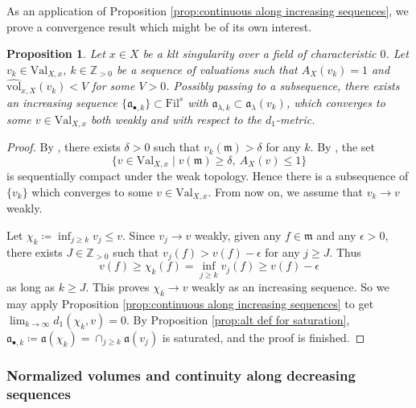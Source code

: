 \documentclass[11pt, leqno]{amsart}%
\theoremstyle{plain}
\newtheorem{proposition}[theorem]{Proposition}
\theoremstyle{definition}
\theoremstyle{remark}
\newcommand{\bZ}{\mathbb{Z}}
\newcommand{\fa}{\mathfrak{a}}
\newcommand{\fm}{\mathfrak{m}}
\newcommand{\Val}{\mathrm{Val}}
\newcommand{\nvol}{\widehat{\mathrm{vol}}}
\newcommand{\Fil}{\mathrm{Fil}}
\numberwithin{equation}{section}
\begin{document}
As an application of Proposition \ref{prop:continuous along increasing sequences}, we prove a convergence result which might be of its own interest. 

\begin{proposition}\label{prop:modified d_1-converging seq}
    Let $x\in X$ be a klt singularity over a field of characteristic $0$. Let $v_k\in\Val_{X,x}$, $k\in\bZ_{>0}$ be a sequence of valuations such that $A_X(v_k)=1$ and $\nvol_{x,X}(v_k)<V$ for some $V>0$. Possibly passing to a subsequence, there exists an increasing sequence $\{\fa_{\bullet,k}\}\subset\Fil^s$ with $\fa_{\lambda,k}\subset\fa_\lambda(v_k)$, which converges to some $v\in\Val_{X,x}$ both weakly and with respect to the $d_1$-metric. 
\end{proposition}


\begin{proof}
    By \cite[Theorem 1.1]{Li18}, there exists $\delta>0$ such that $v_k(\fm)>\delta$ for any $k$. By \cite[Proposition 3.9]{LX16},%
    the set
    \[
        \{v\in\Val_{X,x}\mid v(\fm)\ge\delta,\ A_X(v)\le 1\}
    \]
    is sequentially compact under the weak topology. Hence there is a subsequence of $\{v_k\}$ which converges to some $v\in\Val_{X,x}$. From now on, we assume that $v_k\to v$ weakly.
	
    Let $\chi_k\coloneqq\inf_{j\ge k}v_j\le v$. Since $v_j\to v$ weakly, given any $f\in\fm$ and any $\epsilon>0$, there exists $J\in\bZ_{>0}$ such that $v_j(f)>v(f)-\epsilon$ for any $j\ge J$. Thus
    \[
        v(f)\ge \chi_k(f)=\inf_{j\ge k}v_j(f)\ge v(f)-\epsilon
    \]
    as long as $k\ge J$. This proves $\chi_k\to v$ weakly as an increasing sequence. So we may apply Proposition \ref{prop:continuous along increasing sequences} to get $\lim_{k\to\infty}d_1(\chi_k,v)=0$. By Proposition \ref{prop:alt def for saturation}, $\fa_{\bullet,k}\coloneqq\fa(\chi_k)=\cap_{j\ge k}\fa(v_j)$ is saturated, and the proof is finished. 
\end{proof}


   
\subsubsection{Normalized volumes and continuity along decreasing sequences}\label{ssec:continuity along dec seq}
\end{document}
